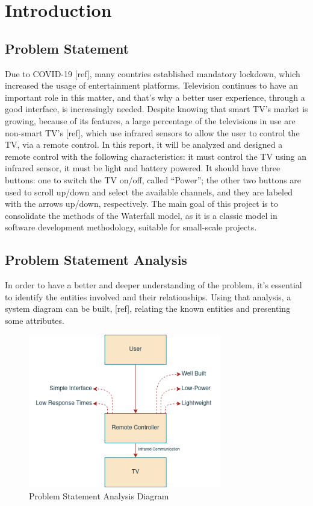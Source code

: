 \documentclass[12pt, letterpaper]{report}
\begin{document}
\chapter{Introduction}
\section{Problem Statement}
Due to COVID-19 [ref], many countries established mandatory lockdown, which increased the usage of entertainment platforms. Television continues to have an important role in this matter, and that’s why a better user experience, through a good interface, is increasingly needed.
Despite knowing that smart TV’s market is growing, because of its features, a large percentage of the televisions in use are non-smart TV’s [ref], which use infrared sensors to allow the user to control the TV, via a remote control. In this report, it will be analyzed and designed a remote control with the following characteristics: it must control the TV using an infrared sensor, it must be light and battery powered. It should have three buttons: one to switch the TV on/off, called “Power”; the other two buttons are used to scroll up/down and select the available channels, and they are labeled with the arrows up/down, respectively. The main goal of this project is to consolidate the methods of the Waterfall model, as it is a classic model in software development methodology, suitable for small-scale projects.

\section{Problem Statement Analysis}
In order to have a better and deeper understanding of the problem, it’s essential to identify the entities involved and their relationships. Using that analysis, a system diagram can be built, [ref], relating the known entities and presenting some attributes.

\begin{figure}[ht]
	\centering
	\includegraphics[width=0.75\textwidth]{prob_statement}
	\caption{Problem Statement Analysis Diagram}
	\label{fig:prob_statement}
\end{figure}
\end{document}
